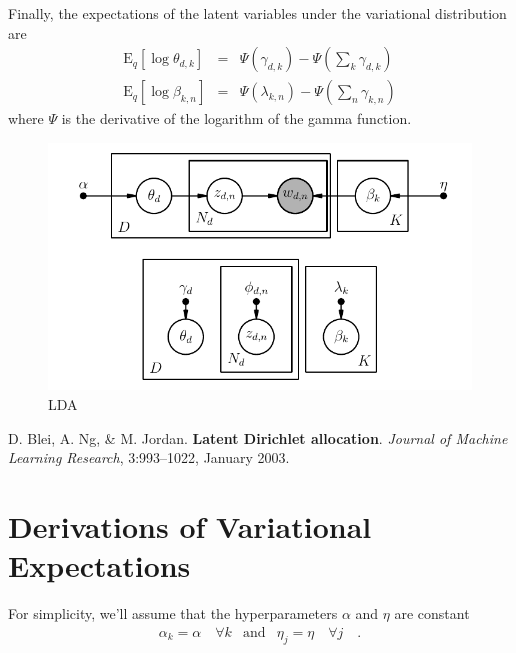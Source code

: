 \documentclass[11pt]{article}
\newcommand{\figlabel}[1]{\label{fig:#1}}
\newcommand{\expect}[2]{\ensuremath{\mathrm{E}_{#1}\left [ {#2} \right ]}}
\begin{document}
Finally, the expectations of the latent variables under the variational
distribution are
\begin{eqnarray}
\expect{q}{\log\theta_{d,k}} &=& \Psi(\gamma_{d,k})
    - \Psi\left(\sum_k \gamma_{d,k}\right) \\
\expect{q}{\log\beta_{k,n}} &=& \Psi(\lambda_{k,n})
    - \Psi\left(\sum_n \gamma_{k,n}\right)
\end{eqnarray}
where $\Psi$ is the derivative of the logarithm of the gamma function.

\begin{figure}
\begin{center}
\includegraphics{lda.pdf}
\end{center}
\caption{%
LDA
\figlabel{lda}}
\end{figure}

\begin{thebibliography}{}\raggedright

D. Blei, A. Ng, \& M. Jordan. \textbf{Latent Dirichlet allocation}.
\emph{Journal of Machine Learning Research}, 3:993–1022, January 2003.

\end{thebibliography}

\appendix

\section{Derivations of Variational Expectations}

For simplicity, we'll assume that the hyperparameters $\alpha$ and $\eta$ are
constant
\begin{eqnarray}
\alpha_k = \alpha\quad\forall k &\mathrm{and}&
\eta_j = \eta\quad\forall j \quad.
\end{eqnarray}
\end{document}
